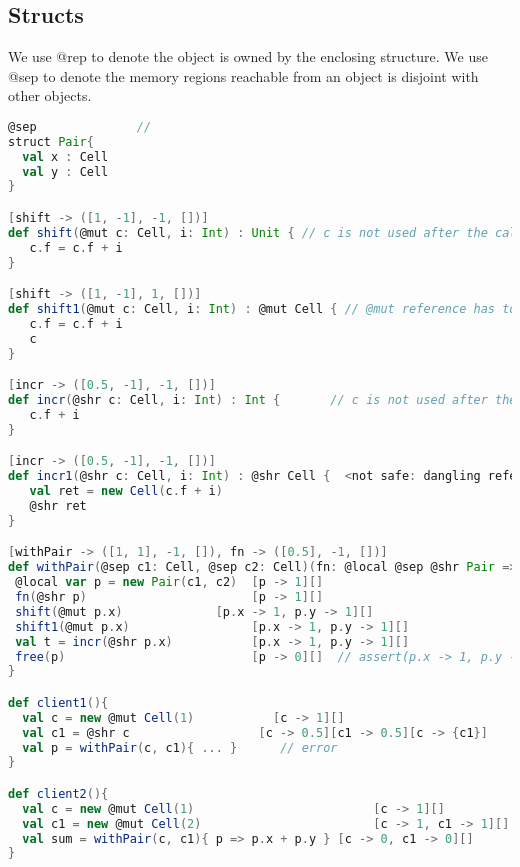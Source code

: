 \clearpage

\subsection{Structs}

\cite{haller2010capabilities}
We use @rep to denote the object is owned by the enclosing structure.
We use @sep to denote the memory regions reachable from an object is disjoint with other objects.

\begin{lstlisting}[language=Scala,basicstyle=\footnotesize\ttfamily]
@sep              //
struct Pair{
  val x : Cell
  val y : Cell
}

[shift -> ([1, -1], -1, [])]
def shift(@mut c: Cell, i: Int) : Unit { // c is not used after the call to shift
   c.f = c.f + i      
}

[shift -> ([1, -1], 1, [])]
def shift1(@mut c: Cell, i: Int) : @mut Cell { // @mut reference has to be returned
   c.f = c.f + i
   c      
}

[incr -> ([0.5, -1], -1, [])]
def incr(@shr c: Cell, i: Int) : Int {       // c is not used after the call to shift
   c.f + i        
}

[incr -> ([0.5, -1], -1, [])]
def incr1(@shr c: Cell, i: Int) : @shr Cell {  <not safe: dangling references>
   val ret = new Cell(c.f + i)
   @shr ret
}

[withPair -> ([1, 1], -1, []), fn -> ([0.5], -1, [])]
def withPair(@sep c1: Cell, @sep c2: Cell)(fn: @local @sep @shr Pair => Int) : Int {
 @local var p = new Pair(c1, c2)  [p -> 1][]
 fn(@shr p)                       [p -> 1][]                     
 shift(@mut p.x)             [p.x -> 1, p.y -> 1][]
 shift1(@mut p.x)                 [p.x -> 1, p.y -> 1][]
 val t = incr(@shr p.x)           [p.x -> 1, p.y -> 1][]
 free(p)                          [p -> 0][]  // assert(p.x -> 1, p.y -> 1)
}

def client1(){
  val c = new @mut Cell(1)           [c -> 1][] 
  val c1 = @shr c                  [c -> 0.5][c1 -> 0.5][c -> {c1}]
  val p = withPair(c, c1){ ... }      // error   
}

def client2(){
  val c = new @mut Cell(1)                         [c -> 1][] 
  val c1 = new @mut Cell(2)                        [c -> 1, c1 -> 1][] 
  val sum = withPair(c, c1){ p => p.x + p.y } [c -> 0, c1 -> 0][]       
}

\end{lstlisting}

